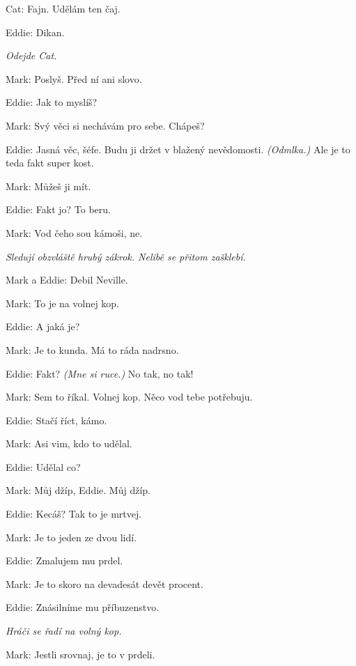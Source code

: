 \medskip
\noindent
Cat: Fajn. Udělám ten čaj.

\medskip
\noindent
Eddie:	Dikan.

\medskip
\noindent
\textit{Odejde Cat.}

\medskip
\noindent
Mark: Poslyš. Před ní ani slovo.

\medskip
\noindent
Eddie: Jak to myslíš?

\medskip
\noindent
Mark: Svý věci si nechávám pro sebe. Chápeš?

\medskip
\noindent
Eddie:	Jasná věc, šéfe. Budu ji držet v blažený nevědomosti. \textit{(Odmlka.)} Ale je to teda fakt super kost.

\medskip
\noindent
Mark: Můžeš ji mít.

\medskip
\noindent
Eddie: Fakt jo? To beru.

\medskip
\noindent
Mark: Vod čeho sou kámoši, ne.

\medskip
\noindent
\textit{Sledují obzvláště hrubý zákrok. Nelibě se přitom zašklebí.}

\medskip
\noindent
Mark a Eddie: Debil Neville.

\medskip
\noindent
Mark: To je na volnej kop.

\medskip
\noindent
Eddie: A jaká je?

\medskip
\noindent
Mark: Je to kunda. Má to ráda nadrsno.

\medskip
\noindent
Eddie: Fakt? \textit{(Mne si ruce.)} No tak, no tak!

\medskip
\noindent
Mark: Sem to říkal. Volnej kop. Něco vod tebe potřebuju.

\medskip
\noindent
Eddie: Stačí říct, kámo.

\medskip
\noindent
Mark: Asi vim, kdo to udělal.

\medskip
\noindent
Eddie:	Udělal co?

\medskip
\noindent
Mark: Můj džíp, Eddie. Můj džíp.

\medskip
\noindent
Eddie: Kecáš? Tak to je mrtvej.

\medskip
\noindent
Mark: Je to jeden ze dvou lidí.

\medskip
\noindent
Eddie: Zmalujem mu prdel.

\medskip
\noindent
Mark: Je to skoro na devadesát devět procent.

\medskip
\noindent
Eddie: Znásilníme mu příbuzenstvo.

\medskip
\noindent
\textit{Hráči se řadí na volný kop.}

\medskip
\noindent
Mark: Jestli srovnaj, je to v prdeli.

